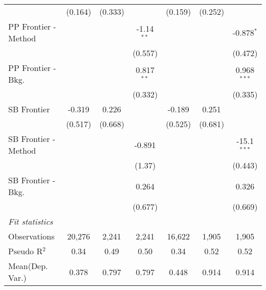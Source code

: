 \begin{tabular}{lcccccc}
                        & (0.164)       & (0.333) &              & (0.159)        & (0.252)     &   \\   
   PP Frontier - Method &               &         & -1.14$^{**}$ &                &             & -0.878$^{*}$\\   
                        &               &         & (0.557)      &                &             & (0.472)\\   
   PP Frontier - Bkg.   &               &         & 0.817$^{**}$ &                &             & 0.968$^{***}$\\   
                        &               &         & (0.332)      &                &             & (0.335)\\   
   SB Frontier          & -0.319        & 0.226   &              & -0.189         & 0.251       &   \\   
                        & (0.517)       & (0.668) &              & (0.525)        & (0.681)     &   \\   
   SB Frontier - Method &               &         & -0.891       &                &             & -15.1$^{***}$\\   
                        &               &         & (1.37)       &                &             & (0.443)\\   
   SB Frontier - Bkg.   &               &         & 0.264        &                &             & 0.326\\   
                        &               &         & (0.677)      &                &             & (0.669)\\   
   \midrule
   \emph{Fit statistics}\\
   Observations         & 20,276        & 2,241   & 2,241        & 16,622         & 1,905       & 1,905\\  
   Pseudo R$^2$         & 0.34          & 0.49    & 0.50         & 0.34           & 0.52        & 0.52\\  
Mean(Dep. Var.) & 0.378 & 0.797 & 0.797 & 0.448 & 0.914 & 0.914 \\
   

\end{tabular}
